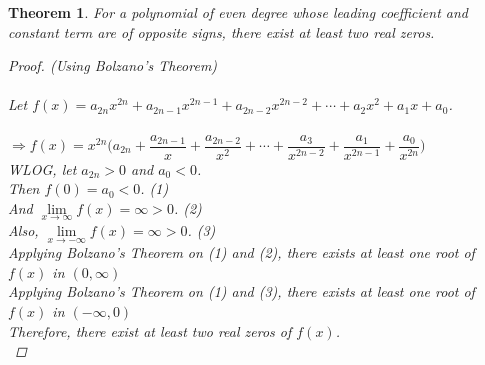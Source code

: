 \documentclass[14]{article}
\newtheorem{theorem}{Theorem}
\theoremstyle{definition}
\theoremstyle{case}
\begin{document}
\begin{theorem}
For a polynomial of even degree whose leading coefficient and constant term are of opposite signs, there exist at least two real zeros.
\begin{proof}
(Using Bolzano's Theorem)\\\\
Let $f(x) = a_{2n} x^{2n} + a_{2n-1}x^{2n-1} + a_{2n-2}x^{2n-2} + \cdots + a_2 x^2 + a_1 x + a_0$.\\\\
$\Rightarrow f(x) = x^{2n} \Big( a_{2n} +
\dfrac{a_{2n-1}}{x} + \dfrac{a_{2n-2}}{x^2} + \cdots + \dfrac{a_{3}}{x^{2n-2}} + \dfrac{a_1}{x^{2n-1}} + \dfrac{a_0}{x^{2n}} \Big)$\\
WLOG, let $a_{2n} > 0$ and $a_0 < 0$.\\
Then $f(0) = a_{0} < 0$. (1)\\
And $\lim\limits_{x \to \infty} f(x) = \infty > 0$. (2)\\
Also, $\lim\limits_{x \to -\infty} f(x) =\infty > 0$. (3)\\
Applying Bolzano's Theorem on (1) and (2), there exists at least one root of $f(x)$ in $(0, \infty)$\\
Applying Bolzano's Theorem on (1) and (3), there exists at least one root of $f(x)$ in $(-\infty, 0)$\\
Therefore, there exist at least two real zeros of $f(x)$.\\
\end{proof}
\end{theorem}
\pagebreak
\end{document}
